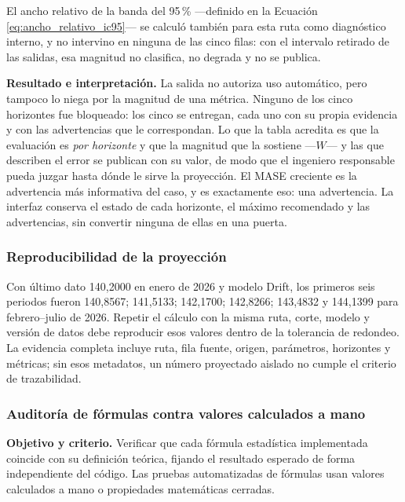 \documentclass[12pt,letterpaper]{article}
\begin{document}
El ancho relativo de la banda del 95\,\% ---definido en la Ecuación \ref{eq:ancho_relativo_ic95}--- se calculó también para esta ruta como diagnóstico interno, y no intervino en ninguna de las cinco filas: con el intervalo retirado de las salidas, esa magnitud no clasifica, no degrada y no se publica.

\textbf{Resultado e interpretación.} La salida no autoriza uso automático, pero tampoco lo niega por la magnitud de una métrica. Ninguno de los cinco horizontes fue bloqueado: los cinco se entregan, cada uno con su propia evidencia y con las advertencias que le correspondan. Lo que la tabla acredita es que la evaluación es \emph{por horizonte} y que la magnitud que la sostiene ---\(W\)--- y las que describen el error se publican con su valor, de modo que el ingeniero responsable pueda juzgar hasta dónde le sirve la proyección. El MASE creciente es la advertencia más informativa del caso, y es exactamente eso: una advertencia. La interfaz conserva el estado de cada horizonte, el máximo recomendado y las advertencias, sin convertir ninguna de ellas en una puerta.

\subsubsection{Reproducibilidad de la proyección}

Con último dato 140,2000 en enero de 2026 y modelo Drift, los primeros seis periodos fueron 140,8567; 141,5133; 142,1700; 142,8266; 143,4832 y 144,1399 para febrero--julio de 2026. Repetir el cálculo con la misma ruta, corte, modelo y versión de datos debe reproducir esos valores dentro de la tolerancia de redondeo. La evidencia completa incluye ruta, fila fuente, origen, parámetros, horizontes y métricas; sin esos metadatos, un número proyectado aislado no cumple el criterio de trazabilidad.

\subsubsection{Auditoría de fórmulas contra valores calculados a mano}

\textbf{Objetivo y criterio.} Verificar que cada fórmula estadística implementada coincide con su definición teórica, fijando el resultado esperado de forma independiente del código. Las pruebas automatizadas de fórmulas usan valores calculados a mano o propiedades matemáticas cerradas.
\end{document}
